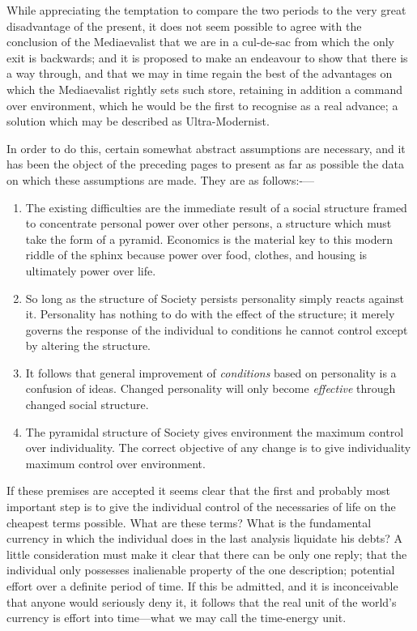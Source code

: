 \documentclass{book}
\begin{document}
While appreciating the temptation to compare the two periods to the very great disadvantage of the present, it does not seem possible to agree with the conclusion of the Mediaevalist that we are in a cul-de-sac from which the only exit is backwards; and it is proposed to make an endeavour to show that there is a way through, and that we may in time regain the best of the advantages on which the Mediaevalist rightly sets such store, retaining in addition a command over environment, which he would be the first to recognise as a real advance; a solution which may be described as Ultra-Modernist.

In order to do this, certain somewhat abstract assumptions are necessary, and it has been the object of the preceding pages to present as far as possible the data on which these assumptions are made. They are as follows:-—

\begin{enumerate}
	\item The existing difficulties are the immediate result of a social structure framed to concentrate personal power over other persons, a structure which must take the form of a pyramid. Economics is the material key to this modern riddle of the sphinx because power over food, clothes, and housing is ultimately power over life.


	\item So long as the structure of Society persists personality simply reacts against it. Personality has nothing to do with the effect of the structure; it merely governs the response of the individual to conditions he cannot control except by altering the structure.


	\item It follows that general improvement of \emph{conditions} based on personality is a confusion of ideas. Changed personality will only become \emph{effective} through changed social structure.


	\item The pyramidal structure of Society gives environment the maximum control over individuality. The correct objective of any change is to give individuality maximum control over environment.



\end{enumerate}
If these premises are accepted it seems clear that the first and probably most important step is to give the individual control of the necessaries of life on the cheapest terms possible. What are these terms? What is the fundamental currency in which the individual does in the last analysis liquidate his debts? A little consideration must make it clear that there can be only one reply; that the individual only possesses inalienable property of the one description; potential effort over a definite period of time. If this be admitted, and it is inconceivable that anyone would seriously deny it, it follows that the real unit of the world’s currency is effort into time—what we may call the time-energy unit.
\end{document}
